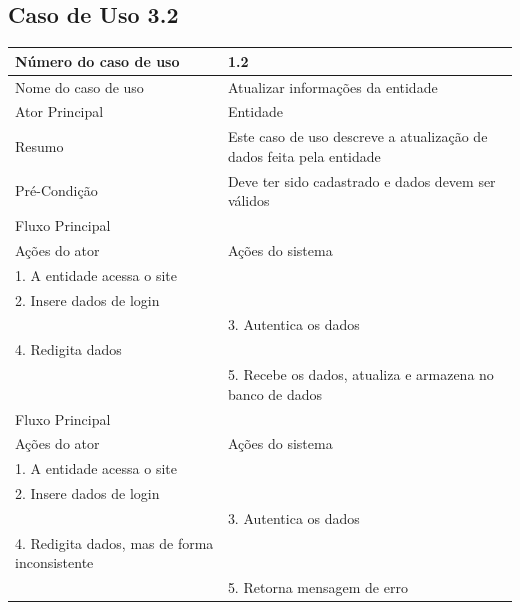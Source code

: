   \subsection{Caso de Uso 3.2}
    \begin{table}[h]
    \begin{center}
    \begin{tabular}{|p{5cm}|p{10cm}|}
      \hline
      Número do caso de uso & 1.2\\
      \hline
      Nome do caso de uso & Atualizar informações da entidade\\
      \hline
      Ator Principal & Entidade\\
      \hline
      Resumo & Este caso de uso descreve a atualização de dados feita pela entidade\\
      \hline
      Pré-Condição & Deve ter sido cadastrado e dados devem ser válidos\\
      \hline
      Fluxo Principal & \\
      \hline
      Ações do ator & Ações do sistema \\
      \hline
      1. A entidade acessa o site & \\
      \hline
      2. Insere dados de login & \\
      \hline
       & 3. Autentica os dados\\
      \hline
      4. Redigita dados & \\
      \hline
      & 5. Recebe os dados, atualiza e armazena no banco de dados\\
      \hline
      Fluxo Principal       & \\
      \hline
      Ações do ator         & Ações do sistema \\
      \hline
      1. A entidade acessa o site & \\
      \hline
      2. Insere dados de login & \\
      \hline
       & 3. Autentica os dados\\
      \hline
      4. Redigita dados, mas de forma inconsistente & \\
      \hline
      & 5. Retorna mensagem de erro\\
      \hline
    \end{tabular}
    \end{center}
    \end{table}

